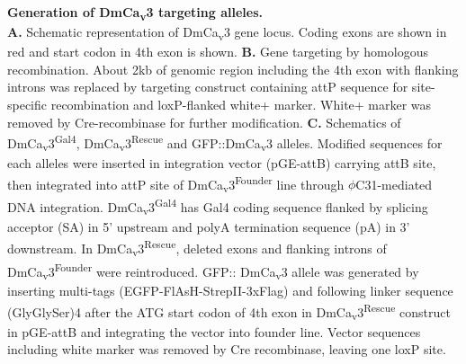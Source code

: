 \label{fig:S1}
\textbf{Generation of DmCa\textsubscript{v}3 targeting alleles.}
\\
\textbf{A.} Schematic representation of DmCa\textsubscript{v}3 gene locus.
Coding exons are shown in red and start codon in 4th exon is shown.
\textbf{B.} Gene targeting by homologous recombination.
About 2kb of genomic region including the 4th exon with flanking introns was replaced by targeting construct containing attP sequence for site-specific recombination and loxP-flanked white+ marker.
White+ marker was removed by Cre-recombinase for further modification.
\textbf{C.} Schematics of DmCa\textsubscript{v}3\textsuperscript{Gal4}, DmCa\textsubscript{v}3\textsuperscript{Rescue} and GFP::DmCa\textsubscript{v}3 alleles.
Modified sequences for each alleles were inserted in integration vector (pGE-attB) carrying attB site, then integrated into attP site of DmCa\textsubscript{v}3\textsuperscript{Founder} line through $\phi$C31-mediated DNA integration.
DmCa\textsubscript{v}3\textsuperscript{Gal4} has Gal4 coding sequence flanked by splicing acceptor (SA) in 5' upstream and polyA termination sequence (pA) in 3' downstream.
In DmCa\textsubscript{v}3\textsuperscript{Rescue}, deleted exons and flanking introns of DmCa\textsubscript{v}3\textsuperscript{Founder} were reintroduced.
GFP:: DmCa\textsubscript{v}3 allele was generated by inserting multi-tags (EGFP-FlAsH-StrepII-3xFlag) and following linker sequence (GlyGlySer)4 after the ATG start codon of 4th exon in DmCa\textsubscript{v}3\textsuperscript{Rescue} construct in pGE-attB and integrating the vector into founder line.
Vector sequences including white marker was removed by Cre recombinase, leaving one loxP site.